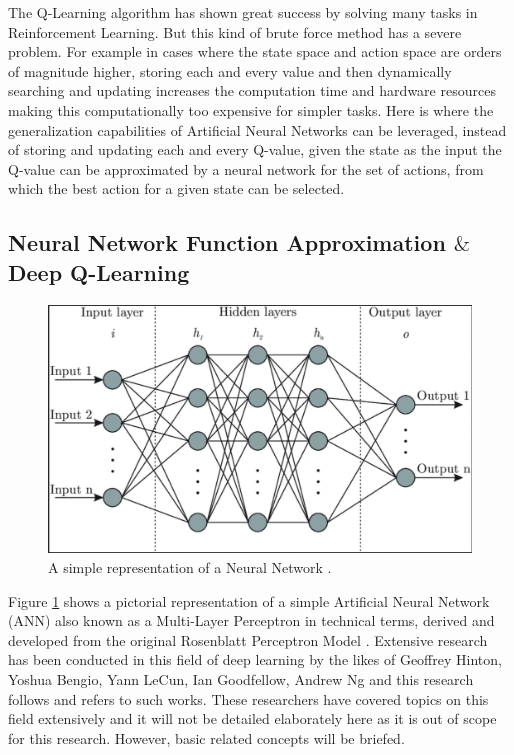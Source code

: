 The Q-Learning algorithm has shown great success by solving many tasks in Reinforcement Learning. But this kind of brute force method has a severe problem. For example in cases where the state space and action space are orders of magnitude higher, storing each and every value and then dynamically searching and updating increases the computation time and hardware resources making this computationally too expensive for simpler tasks. Here is where the generalization capabilities of Artificial Neural Networks \cite{mcculloch1943logical} can be leveraged, instead of storing and updating each and every Q-value, given the state as the input the Q-value can be approximated by a neural network for the set of actions, from which the best action for a given state can be selected. \\

\subsection{Neural Network Function Approximation $\&$ Deep Q-Learning}

\begin{figure}[h!]
    \centering
    \includegraphics[width=\textwidth]{images/ANN.png}
    \caption{A simple representation of a Neural Network \cite{ANNPic}.}
    \label{fig:ANN}
\end{figure}

Figure \ref{fig:ANN} shows a pictorial representation of a simple Artificial Neural Network (ANN) also known as a Multi-Layer Perceptron in technical terms, derived and developed from the original Rosenblatt Perceptron Model \cite{rosenblatt1958perceptron}. Extensive research has been conducted in this field of deep learning by the likes of Geoffrey Hinton, Yoshua Bengio, Yann LeCun, Ian Goodfellow, Andrew Ng and this research follows and refers to such works. These researchers have covered topics on this field extensively and it will not be detailed elaborately here as it is out of scope for this research. However, basic related concepts will be briefed. \\

